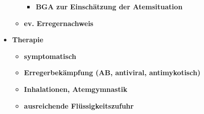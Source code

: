 \begin{itemize}
\begin{itemize}
\begin{itemize}
								\item \textbf{BGA zur Einschätzung der Atemsituation}
							\end{itemize}
						\item \textbf{ev. Erregernachweis}
					\end{itemize}
				\item \textbf{Therapie}
					\begin{itemize}
						\item \textbf{symptomatisch}
						\item \textbf{Erregerbekämpfung (AB, antiviral, antimykotisch)}
						\item \textbf{Inhalationen, Atemgymnastik}
						\item \textbf{ausreichende Flüssigkeitszufuhr}
					\end{itemize}
			\end{itemize}
